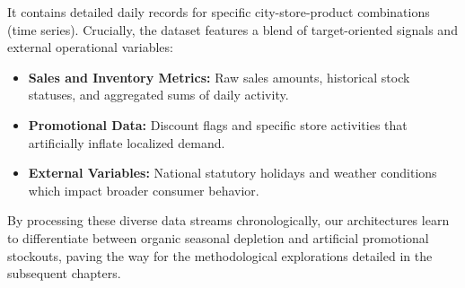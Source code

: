 It contains detailed daily records for specific city-store-product combinations (time series). Crucially, the dataset features a blend of target-oriented signals and external operational variables:
\begin{itemize}
    \item \textbf{Sales and Inventory Metrics:} Raw sales amounts, historical stock statuses, and aggregated sums of daily activity.
    \item \textbf{Promotional Data:} Discount flags and specific store activities that artificially inflate localized demand.
    \item \textbf{External Variables:} National statutory holidays and weather conditions which impact broader consumer behavior.
\end{itemize}

By processing these diverse data streams chronologically, our architectures learn to differentiate between organic seasonal depletion and artificial promotional stockouts, paving the way for the methodological explorations detailed in the subsequent chapters.

